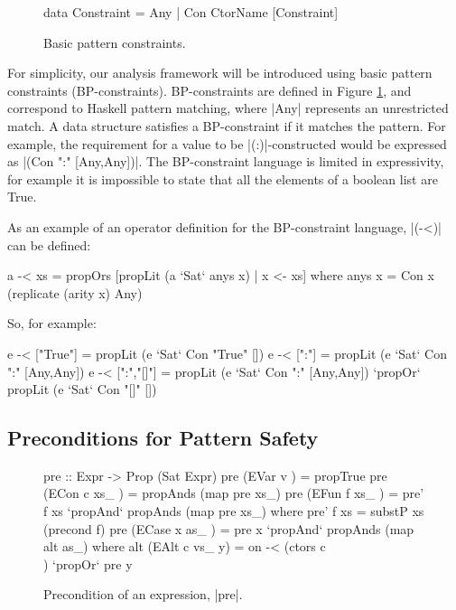 \begin{figure}
\begin{code}
data Constraint  =  Any
                 |  Con CtorName [Constraint]
\end{code}
\caption{Basic pattern constraints.}
\label{figC:basic}
\end{figure}

For simplicity, our analysis framework will be introduced using basic pattern constraints (BP-constraints). BP-constraints are defined in Figure \ref{figC:basic}, and correspond to Haskell pattern matching, where |Any| represents an unrestricted match. A data structure satisfies a BP-constraint if it matches the pattern. For example, the requirement for a value to be |(:)|-constructed would be expressed as |(Con ":" [Any,Any])|. The BP-constraint language is limited in expressivity, for example it is impossible to state that all the elements of a boolean list are True.

As an example of an operator definition for the BP-constraint language, |(-<)| can be defined:

\begin{code}
a -< xs = propOrs [propLit (a `Sat` anys x) | x <- xs]
    where anys x = Con x (replicate (arity x) Any)
\end{code}

\noindent So, for example:

\begin{code}
e -< ["True"]    =  propLit (e `Sat` Con "True" [])
e -< [":"]       =  propLit (e `Sat` Con ":" [Any,Any])
e -< [":","[]"]  =  propLit (e `Sat` Con ":" [Any,Any]) `propOr`
                    propLit (e `Sat` Con "[]" [])
\end{code}

\subsection{Preconditions for Pattern Safety}
\label{secC:precond}

\begin{figure}
\begin{code}
pre ::  Expr -> Prop (Sat Expr)
pre (EVar v       ) = propTrue
pre (ECon c xs_   ) = propAnds (map pre xs_)
pre (EFun f xs_   ) = pre' f xs `propAnd` propAnds (map pre xs_)
    where pre' f xs = substP xs (precond f)
pre (ECase x as_  ) = pre x `propAnd` propAnds (map alt as_)
    where alt (EAlt c vs_ y) = on -< (ctors c \\ [c]) `propOr` pre y
\end{code}
\caption{Precondition of an expression, |pre|.}
\label{figC:precondition}
\end{figure}

